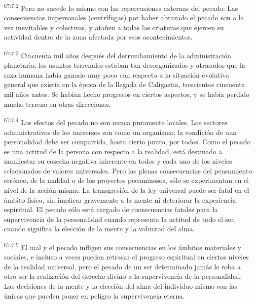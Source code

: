 \par
\textsuperscript{67:7.2} Pero no sucede lo mismo con las repercusiones externas del pecado: Las consecuencias impersonales (centrífugas) por haber abrazado el pecado son a la vez inevitables y colectivas, y atañen a todas las criaturas que ejercen su actividad dentro de la zona afectada por esos acontecimientos.

\par
\textsuperscript{67:7.3} Cincuenta mil años después del derrumbamiento de la administración planetaria, los asuntos terrenales estaban tan desorganizados y atrasados que la raza humana había ganado muy poco con respecto a la situación evolutiva general que existía en la época de la llegada de Caligastia, trescientos cincuenta mil años antes. Se habían hecho progresos en ciertos aspectos, y se había perdido mucho terreno en otras direcciones.

\par
\textsuperscript{67:7.4} Los efectos del pecado no son nunca puramente locales. Los sectores administrativos de los universos son como un organismo; la condición de una personalidad debe ser compartida, hasta cierto punto, por todos. Como el pecado es una actitud de la persona con respecto a la realidad, está destinado a manifestar su cosecha negativa inherente en todos y cada uno de los niveles relacionados de valores universales. Pero las plenas consecuencias del pensamiento erróneo, de la maldad o de los proyectos pecaminosos, sólo se experimentan en el nivel de la acción misma. La transgresión de la ley universal puede ser fatal en el ámbito físico, sin implicar gravemente a la mente ni deteriorar la experiencia espiritual. El pecado sólo está cargado de consecuencias fatales para la supervivencia de la personalidad cuando representa la actitud de todo el ser, cuando significa la elección de la mente y la voluntad del alma.

\par
\textsuperscript{67:7.5} El mal y el pecado infligen sus consecuencias en los ámbitos materiales y sociales, e incluso a veces pueden retrasar el progreso espiritual en ciertos niveles de la realidad universal, pero el pecado de un ser determinado jamás le roba a otro ser la realización del derecho divino a la supervivencia de la personalidad. Las decisiones de la mente y la elección del alma del individuo mismo son las únicas que pueden poner en peligro la supervivencia eterna.


